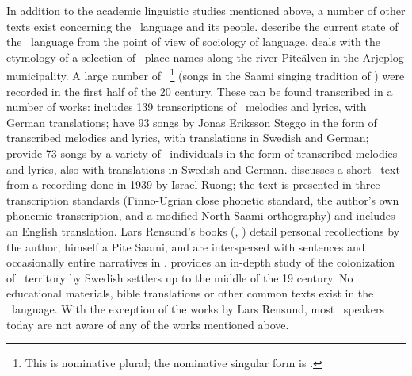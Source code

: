 In addition to the academic linguistic studies mentioned above, a number of other texts exist concerning the \PS\ language and its people. \citet{ValijarviWilbur2011} describe the current state of the \PS\ language from the  point of view of sociology of language. \citet{sjaggo2010a} deals with the etymology of a selection of \PS\ place names along the river Piteälven in the Arjeplog municipality. 
A large number of \PS\ \footnote{This is nominative plural; the nominative singular form is .} 
(songs in the Saami singing tradition of ) were recorded in the first half of the 20 century. These can be found transcribed in a number of works: 
\citet{tiren1942a} includes 139 transcriptions of \PS\ melodies and lyrics, with German translations; 
\citet{grundstroem1958a} have 93 songs by Jonas Eriksson Steggo in the form of transcribed melodies and lyrics, with translations in Swedish and German; 
\citet{grundstroem1963a} provide 73 songs by a variety of \PS\ individuals in the form of transcribed melodies and lyrics, also with translations in Swedish and German.
\citet{wickman1964} discusses a short \PS\ text from a recording done in 1939 by Israel Ruong; the text is presented in three transcription standards (Finno-Ugrian close phonetic standard, the author’s own phonemic transcription, and a modified North Saami orthography) and includes an English translation. 
Lars Rensund’s books (\citeyear{Rensund1982}, \citeyear{Rensund1986}) detail personal recollections by the author, himself a Pite Saami, and are interspersed with sentences and occasionally  entire narratives in \PS. \citet{bylund1956} provides an in-depth study of the colonization of \PS\ territory by Swedish settlers up to the middle of the 19 century. 
No educational materials, bible translations or other common texts exist in the \PS\ language. With the exception of the works by Lars Rensund, most \PS\ speakers today are not aware of any of the works mentioned above. 



